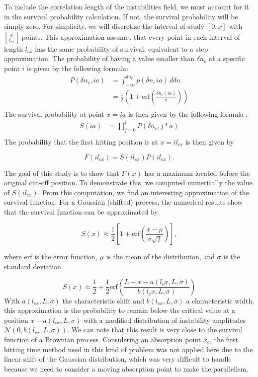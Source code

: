 \documentclass[11pt,a4paper,openany]{report}
\begin{document}
\begin{multicols}{2}
    To include the correlation length of the instabilities field, we must account for it in the survival probability calculation. If not, the survival probability will be simply zero. For simplicity, we will discretize the interval of study $[0, x]$ with $\left\lfloor \frac{x}{l_{cx}} \right\rfloor$ points. This approximation assumes that every point in each interval of length $l_{cx}$ has the same probability of survival, equivalent to a step approximation. The probability of having a value smaller than $\delta n_c$ at a specific point $i$ is given by the following formula:
    \begin{align*}
        P(\delta n_c, ia) & = \int_{-\infty}^{\delta n_c} p(\delta n, ia) \, d\delta n                         \\
                          & = \frac{1}{2}\left(1 + \text{erf}\left(\frac{\delta n_c(ia)}{\sigma}\right)\right) \\
    \end{align*}
    The survival probability at point  $x = ia$ is then given by the following formula :
    \begin{align*}
        S(ia) & = \prod_{j=0}^{i} P(\delta n_c, j*a) \\
    \end{align*}
    The probability that the first hitting position is at \( x = il_{cx} \) is then given by

    \[ F(il_{cx}) = S(il_{cx})P(il_{cx}). \]

    The goal of this study is to show that \( F(x) \) has a maximum located before the original cut-off position. To demonstrate this, we computed numerically the value of \( S(il_{cx}) \). From this computation, we find an interesting approximation of the survival function. For a Gaussian (shifted) process, the numerical results show that the survival function can be approximated by:

    \[ S(x) \approx \frac{1}{2} \left[1 + \text{erf}\left(\frac{x - \mu}{\sigma \sqrt{2}}\right)\right], \]

    where \( \text{erf} \) is the error function, \( \mu \) is the mean of the distribution, and \( \sigma \) is the standard deviation.

    \begin{equation}\label{survival}
        S(x) \approx \frac{1}{2} + \frac{1}{2}\text{erf}\left(\frac{L - x- a(l_cx, L, \sigma)}{b(l_cx, L, \sigma)} \right)
    \end{equation}
    With \( a(l_{cx}, L, \sigma) \) the characteristic shift and \( b(l_{cx}, L, \sigma) \) a characteristic width, this approximation is the probability to remain below the critical value at a position \( x - a(l_{cx}, L, \sigma) \) with a modified distribution of instability amplitudes \( \mathcal{N}(0, b(l_{cx}, L, \sigma)) \). We can note that this result is very close to the survival function of a Brownian process. Considering an absorption point \( x_c \), the first hitting time method used in this kind of problem was not applied here due to the linear shift of the Gaussian distribution, which was very difficult to handle because we need to consider a moving absorption point to make the parallelism.


\end{multicols}
\end{document}

